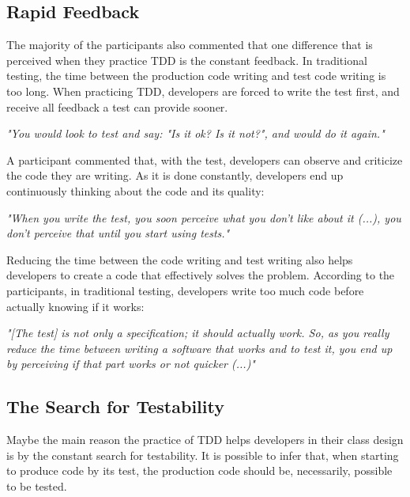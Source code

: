 \documentclass[times]{speauth}
\begin{document}
\subsection{Rapid Feedback}

The majority of the participants also commented that one difference that is
perceived when they practice TDD is the constant feedback. In traditional testing,
the time between the production code writing and test code writing is too long.
When practicing TDD, developers are forced to write the test first, and receive all
feedback a test can provide sooner.

\begin{framed}
	\textit{"You would look to test and say: "Is it ok? Is it not?", and would do it again."}
\end{framed}

A participant commented that, with the test, developers can observe
and criticize the code they are writing. As it is done constantly,
developers end up continuously thinking about the code and its
quality:

\begin{framed}
	\textit{"When you write the test, you soon perceive what you don't like about it (...), 
	you don't perceive that until you start using tests."}
\end{framed}

Reducing the time between the code writing and test writing also helps developers to
create a code that effectively solves the problem. According to the participants, in traditional
testing, developers write too much code before actually knowing if it works:

\begin{framed}
	\textit{"[The test] is not only a specification; it should actually work. So, as you really reduce
	the time between writing a software that works and to test it, you end up by perceiving if that
	part works or not quicker (...)"}
\end{framed}

\subsection{The Search for Testability}

Maybe the main reason the practice of TDD helps developers in their class design is
by the constant search for testability. It is possible to infer that,
when starting to produce code by its test, the production code should be, necessarily,
possible to be tested.
\end{document}
